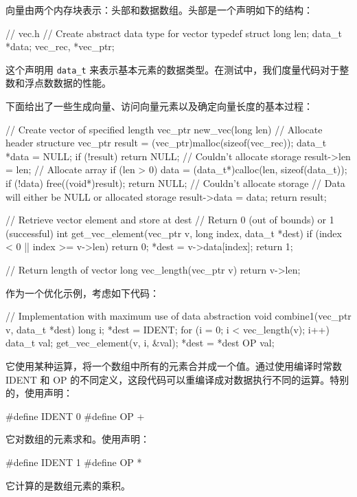 向量由两个内存块表示：头部和数据数组。头部是一个声明如下的结构：

\begin{cppcode}
// vec.h
// Create abstract data type for vector
typedef struct {
  long len;
  data_t *data;
} vec_rec, *vec_ptr;
\end{cppcode}

这个声明用 \verb|data_t| 来表示基本元素的数据类型。在测试中，我们度量代码对于整数和浮点数数据的性能。

下面给出了一些生成向量、访问向量元素以及确定向量长度的基本过程：

\begin{cppcode}
// Create vector of specified length
vec_ptr new_vec(long len) {
  // Allocate header structure
  vec_ptr result = (vec_ptr)malloc(sizeof(vec_rec));
  data_t *data = NULL;
  if (!result) return NULL; // Couldn't allocate storage
  result->len = len;
  // Allocate array
  if (len > 0) {
    data = (data_t*)calloc(len, sizeof(data_t));
    if (!data) {
      free((void*)result);
      return NULL; // Couldn't allocate storage
    }
  }
  // Data will either be NULL or allocated storage
  result->data = data;
  return result;
}

// Retrieve vector element and store at dest
// Return 0 (out of bounds) or 1 (successful)
int get_vec_element(vec_ptr v, long index, data_t *dest) {
  if (index < 0 || index >= v->len) return 0;
  *dest = v->data[index];
  return 1;
}

// Return length of vector
long vec_length(vec_ptr v) {
  return v->len;
}
\end{cppcode}

作为一个优化示例，考虑如下代码：

\begin{cppcode}
// Implementation with maximum use of data abstraction
void combine1(vec_ptr v, data_t *dest) {
  long i;
  *dest = IDENT;
  for (i = 0; i < vec_length(v); i++) {
    data_t val;
    get_vec_element(v, i, &val);
    *dest = *dest OP val;
  }
}
\end{cppcode}

它使用某种运算，将一个数组中所有的元素合并成一个值。通过使用编译时常数 IDENT 和 OP 的不同定义，这段代码可以重编译成对数据执行不同的运算。特别的，使用声明：
\begin{cppcode}
#define IDENT 0
#define OP +
\end{cppcode}
它对数组的元素求和。使用声明：
\begin{cppcode}
#define IDENT 1
#define OP *
\end{cppcode}
它计算的是数组元素的乘积。

